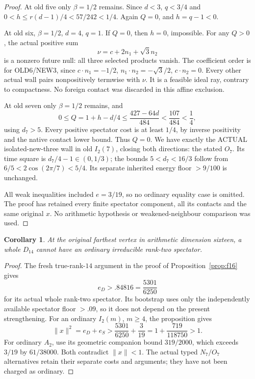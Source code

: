 \documentclass[11pt]{article}
\newtheorem{corollary}[theorem]{Corollary}
\begin{document}
\begin{proof}
At old five only \(\beta=1/2\) remains.
Since \(d<3\), \(q<3/4\) and
\(0<h\le r(d-1)/4<57/242<1/4\).
Again \(Q=0\), and \(h=q-1<0\).

At old six, \(\beta=1/2\), \(d=4\), \(q=1\).
If \(Q=0\), then \(h=0\), impossible.
For any \(Q>0\), the actual positive sum
\[
                          \nu=c+2n_1+\sqrt3n_2
\]
is a nonzero future null: all three selected products vanish.
The coefficient order is for OLD6/NEW3, since
\(c\cdot n_1=-1/2\), \(n_1\cdot n_2=-\sqrt3/2\),
\(c\cdot n_2=0\).
Every other actual wall pairs nonpositively termwise with \(\nu\).
It is a feasible ideal ray, contrary to compactness.
No foreign contact was discarded in this affine exclusion.

At old seven only \(\beta=1/2\) remains, and
\[
 0\le Q=1+h-d/4
 \le{\frac{427-64d}{484}}<{\frac{107}{484}}<{\frac{1}{4}},
\]
using \(d_7>5\).
Every positive spectator cost is at least \(1/4\), by inverse
positivity and the native contact lower bound.  Thus \(Q=0\).
We have exactly the ACTUAL isolated-new-three wall in old
\(I_2(7)\), closing both directions: the stated \(O_7\).
Its time square is \(d_7/4-1\in(0,1/3)\);
the bounds \(5<d_7<16/3\) follow from
\(6/5<2\cos(2\pi/7)<5/4\).
Its separate inherited energy floor \(>9/100\) is unchanged.

All weak inequalities included \(e=3/19\), so no ordinary equality
case is omitted.  The proof has retained every finite spectator
component, all its contacts and the same original \(x\).
No arithmetic hypothesis or weakened-neighbour comparison was used.
\end{proof}

\begin{corollary}\label{cor:D14ordinarydihedral}
At the original farthest vertex in arithmetic dimension sixteen,
a whole \(D_{14}\) cannot have an ordinary irreducible
rank-two spectator.
\end{corollary}
\begin{proof}
The fresh true-rank-\(14\) argument in the proof of
Proposition~\ref{prop:f16} gives
\[
                         e_D>.84816={\frac{5301}{6250}}
\]
for its actual whole rank-two spectator.
Its bootstrap uses only the independently available spectator
floor \(>.09\), so it does not depend on the present strengthening.
For an ordinary \(I_2(m)\), \(m\ge4\), the proposition gives
\[
 \|x\|^2=e_D+e_S>
 {\frac{5301}{6250}}+{\frac{3}{19}}
 =1+{\frac{719}{118750}}>1 .
\]
For ordinary \(A_2\), use its geometric companion bound
\(319/2000\), which exceeds \(3/19\) by \(61/38000\).
Both contradict \(\|x\|<1\).
The actual typed \(N_7/O_7\) alternatives retain their separate
costs and arguments; they have not been charged as ordinary.
\end{proof}
\end{document}
